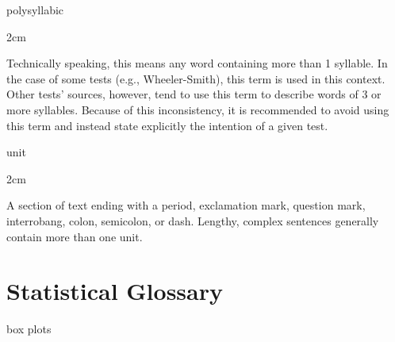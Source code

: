 \documentclass[
]{book}
\newenvironment{glsentry}
  {
  \begin{minipage}{\textwidth}
  }
  {
  \end{minipage}
  }
\newenvironment{glsterm}
  {
  \bfseries
  }
  {
  }
\newenvironment{glsdef}
  {
  \noindent
  \flushleft
  \begin{adjustwidth}{2cm}{}
  }
  {
  \end{adjustwidth}
  }
\theoremstyle{definition}
\theoremstyle{definition}
\theoremstyle{definition}
\theoremstyle{definition}
\theoremstyle{remark}
\begin{document}
\begin{glsentry}

\begin{glsterm}
polysyllabic

\end{glsterm}

\begin{glsdef}
Technically speaking, this means any word containing more than 1 syllable. In the case of some tests (e.g., Wheeler-Smith), this term is used in this context. Other tests' sources, however, tend to use this term to describe words of 3 or more syllables. Because of this inconsistency, it is recommended to avoid using this term and instead state explicitly the intention of a given test.

\end{glsdef}

\end{glsentry}

\begin{glsentry}

\begin{glsterm}
unit

\end{glsterm}

\begin{glsdef}
A section of text ending with a period, exclamation mark, question mark, interrobang, colon, semicolon, or dash. Lengthy, complex sentences generally contain more than one unit.

\end{glsdef}

\end{glsentry}

\hypertarget{stat-terms}{%
\section{Statistical Glossary}\label{stat-terms}}

\begin{glsterm}
box plots

\end{glsterm}
\end{document}
